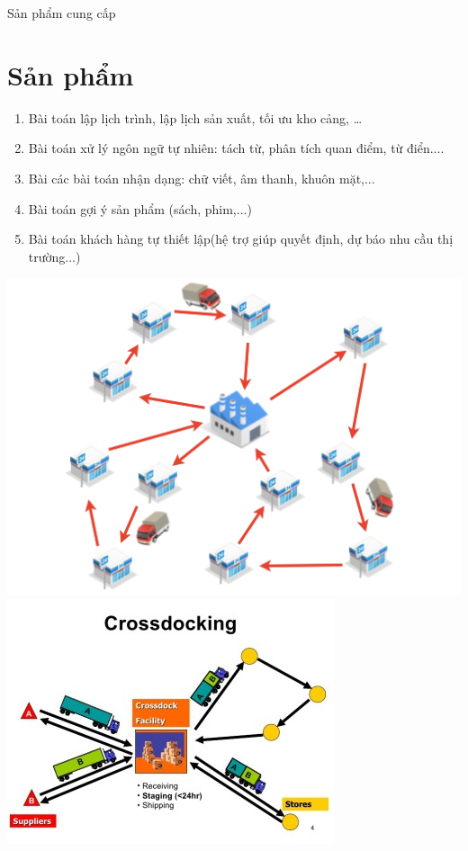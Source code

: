 \documentclass{beamer}
\begin{document}
\begin{frame}{Sản phẩm cung cấp}
\section{Sản phẩm}
\begin{enumerate}
\item Bài toán lập lịch trình, lập lịch sản xuất, tối ưu kho cảng, …

\item Bài toán xử lý ngôn ngữ tự nhiên: tách từ, phân tích quan điểm, từ điển....

\item Bài các bài toán nhận dạng: chữ viết, âm thanh, khuôn mặt,...
\item Bài toán gợi ý sản phẩm (sách, phim,...)
\item Bài toán khách hàng tự thiết lập(hệ trợ giúp quyết định, dự báo nhu cầu thị trường...)
\end{enumerate}
\includegraphics[scale=0.2]{VHR.png}
\includegraphics[scale=0.2]{CD.jpg}

\end{frame}
\end{document}
